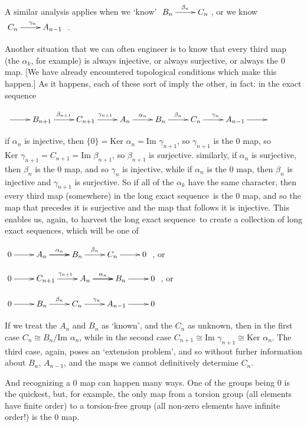 \documentclass[12pt]{article}
\def\ctln{\centerline}
\def\nidt{\noindent}
\def\msk{\medskip}
\def\ssk{\smallskip}
\def\im{\textrm{Im }}
\def\krr{\textrm{Ker }}
\def\lxs{long exact sequence}
\def\lxss{long exact sequences}
\begin{document}
\ssk

A similar analysis applies when we `know' $\xymatrix{B_n \ar[r]^{\beta_n} & C_n}$, or we know 
$\xymatrix{C_n \ar[r]^{\gamma_n}&A_{n-1}}$ .

\msk

Another situation that we can often engineer is to know that every third map (the $\alpha_k$,
for example) is always injective, or always surjective, or always the $0$ map. [We have
already encountered topological conditions which make this happen.] As it happens, each of these 
sort of imply the other, in fact: in the exact sequence

\ssk

\ctln{$\xymatrix{\ar[r]&
B_{n+1} \ar[r]^{\beta_{n+1}} &
C_{n+1} \ar[r]^{\gamma_{n+1}}&
A_n \ar[r]^{\alpha_n}&
B_n \ar[r]^{\beta_n} &
C_n \ar[r]^{\gamma_n}&
A_{n-1}\ar[r]&}$}

\ssk

\nidt if $\alpha_n$ is injective, then 
$\{0\} = \krr\alpha_n=\im\gamma_{n+1}$, so $\gamma_{n+1}$ is the $0$ map,
so $\krr\gamma_{n+1} = C_{n+1} = \im\beta_{n+1}$, so $\beta_{n+1}$ is surjective.
similarly, if $\alpha_n$ is surjective, then $\beta_n$ is the $0$ map, and so
$\gamma_n$ is injective, while if $\alpha_n$ is the $0$ map, then $\beta_n$ is
injective and $\gamma_{n+1}$ is surjective. So if all of the $\alpha_k$
have the same character, then every third map (somewhere) in the \lxs\ is
the $0$ map, and so the map that precedes it is surjective and the map that
follows it is injective. This enables us, again, to harvest the \lxs\ to create a
collection of \lxss, which will be one of

\ssk


\hskip1in{$\xymatrix{
0 \ar[r]&
A_n \ar[r]^{\alpha_n} \ar[r]&
B_n \ar[r]^{\beta_n} &
C_n \ar[r]&
0
}$ , or}

\hskip2in{$\xymatrix{
0 \ar[r]&
C_{n+1} \ar[r]^{\gamma_{n+1}}&
A_n \ar[r]^{\alpha_n} \ar[r]&
B_n \ar[r]&
0
}$ , or}

\hskip3in{$\xymatrix{
0 \ar[r]&
B_n \ar[r]^{\beta_n} &
C_n \ar[r]^{\gamma_n}&
A_{n-1} \ar[r]&
0
}$}



\ssk

\nidt If we treat the $A_n$ and $B_n$ as `known', and the $C_n$ as unknown,
then in the first case $C_n\cong B_n/\im\alpha_n$, while in the second
case $C_{n+1}\cong \im\gamma_{n+1}\cong\krr\alpha_{n}$. The third case, 
again, poses an `extension problem', and so without furher information about
$B_n$, $A_{n-1}$, and the maps we cannot definitively determine $C_n$.

\ssk

And recognizing a $0$ map can happen many ways. One of the groups being $0$ is the 
quickest, but, for example, the only map from a torsion group (all elements have
finite order) to a torsion-free group (all non-zero elements have infinite order!)
is the $0$ map.
\end{document}
